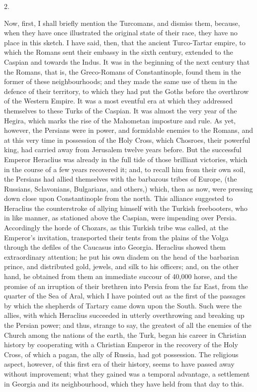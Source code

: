 2.

Now, first, I shall briefly
mention the Turcomans, and dismiss them, because, when they have once
illustrated the original state of their race, they have no place in
this sketch. I have said, then, that the ancient Turco-Tartar empire,
to which the Romans sent their embassy in the sixth century, extended
to the Caspian and towards the Indus. It was in the beginning of the
next century that the Romans, that is, the Greco-Romans of
Constantinople, found them in the former of these neighbourhoods; and
they made the same use of them in the defence of their territory, to
which they had put the Goths before the overthrow of the Western
Empire. It was a most eventful era at which they addressed themselves
to these Turks of the Caspian. It was almost the very year of the
Hegira, which marks the rise of the Mahometan imposture and rule. As
yet, however, the Persians were in power, and formidable enemies to
the Romans, and at this very time in possession of the Holy Cross,
which Chosroes, their powerful king, had carried away from Jerusalem
twelve years before. But the successful Emperor Heraclius was already
in the full tide of those brilliant victories, which in the course of
a few years recovered it; and, to recall him from their own soil, the
Persians had allied themselves with the barbarous tribes of Europe,
(the Russians, Sclavonians, Bulgarians, and others,) which, then as
now, were pressing down close upon Constantinople from the north. This
alliance suggested to Heraclius the counterstroke of allying himself
with the Turkish freebooters, who in like manner, as stationed above
the Caspian, were impending over Persia. Accordingly the horde of
Chozars, as this Turkish tribe was called, at the Emperor's
invitation, transported their tents from the plains of the Volga
through the defiles of the Caucasus into Georgia. Heraclius showed
them extraordinary attention; he put his own diadem on the head of the
barbarian prince, and distributed gold, jewels, and silk to his
officers; and, on the other hand, he obtained from them an immediate
succour of 40,000 horse, and the promise of an irruption of their
brethren into Persia from the far East, from the quarter of the Sea of Aral, which I have pointed out as the first of the passages by
which the shepherds of Tartary came down upon the South. Such were the
allies, with which Heraclius succeeded in utterly overthrowing and
breaking up the Persian power; and thus, strange to say, the greatest
of all the enemies of the Church among the nations of the earth, the
Turk, began his career in Christian history by cooperating with a
Christian Emperor in the recovery of the Holy Cross, of which a pagan,
the ally of Russia, had got possession. The religious aspect, however,
of this first era of their history, seems to have passed away without
improvement; what they gained was a temporal advantage, a settlement
in Georgia and its neighbourhood, which they have held from that day
to this.

